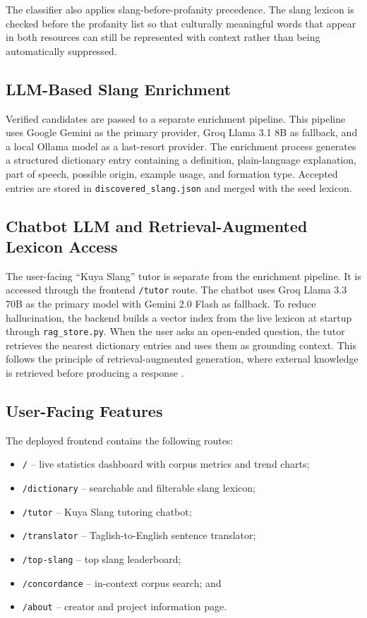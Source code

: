 The classifier also applies slang-before-profanity precedence. The slang lexicon is checked before the profanity list so that culturally meaningful words that appear in both resources can still be represented with context rather than being automatically suppressed.

\subsection{LLM-Based Slang Enrichment}
Verified candidates are passed to a separate enrichment pipeline. This pipeline uses Google Gemini as the primary provider, Groq Llama 3.1 8B as fallback, and a local Ollama model as a last-resort provider. The enrichment process generates a structured dictionary entry containing a definition, plain-language explanation, part of speech, possible origin, example usage, and formation type. Accepted entries are stored in \texttt{discovered\_slang.json} and merged with the seed lexicon.

\subsection{Chatbot LLM and Retrieval-Augmented Lexicon Access}
The user-facing ``Kuya Slang'' tutor is separate from the enrichment pipeline. It is accessed through the frontend \texttt{/tutor} route. The chatbot uses Groq Llama 3.3 70B as the primary model with Gemini 2.0 Flash as fallback. To reduce hallucination, the backend builds a vector index from the live lexicon at startup through \texttt{rag\_store.py}. When the user asks an open-ended question, the tutor retrieves the nearest dictionary entries and uses them as grounding context. This follows the principle of retrieval-augmented generation, where external knowledge is retrieved before producing a response \cite{b10}.

\subsection{User-Facing Features}
The deployed frontend contains the following routes:

\begin{itemize}
    \item \texttt{/} -- live statistics dashboard with corpus metrics and trend charts;
    \item \texttt{/dictionary} -- searchable and filterable slang lexicon;
    \item \texttt{/tutor} -- Kuya Slang tutoring chatbot;
    \item \texttt{/translator} -- Taglish-to-English sentence translator;
    \item \texttt{/top-slang} -- top slang leaderboard;
    \item \texttt{/concordance} -- in-context corpus search; and
    \item \texttt{/about} -- creator and project information page.
\end{itemize}

